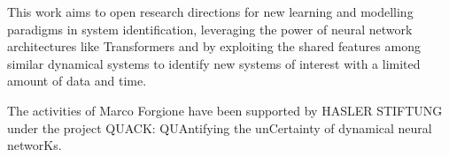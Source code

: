\documentclass{ifacconf}
\begin{document}
This work aims to open research directions for new learning and modelling paradigms in system identification, leveraging the power of neural network architectures like Transformers and by exploiting the shared features among similar dynamical systems to identify new systems of interest with a limited amount of data and time. 

\begin{ack}
The activities of Marco Forgione have  been supported by HASLER STIFTUNG under the project QUACK: QUAntifying the unCertainty of dynamical neural networKs.
\end{ack}

\end{document}

